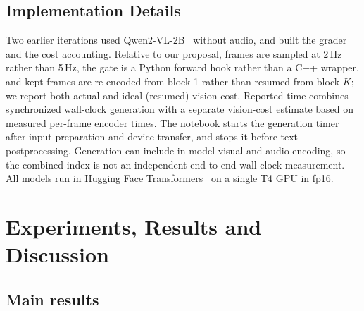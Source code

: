 \documentclass[conference]{IEEEtran}
\begin{document}
\subsection{Implementation Details}
Two earlier iterations used Qwen2-VL-2B~\cite{wang2024qwen2vl} without audio, and built the grader and the cost accounting. Relative to our proposal, frames are sampled at 2\,Hz rather than 5\,Hz, the gate is a Python forward hook rather than a C++ wrapper, and kept frames are re-encoded from block 1 rather than resumed from block $K$; we report both actual and ideal (resumed) vision cost. Reported time combines synchronized wall-clock generation with a separate vision-cost estimate based on measured per-frame encoder times. The notebook starts the generation timer after input preparation and device transfer, and stops it before text postprocessing. Generation can include in-model visual and audio encoding, so the combined index is not an independent end-to-end wall-clock measurement. All models run in Hugging Face Transformers~\cite{wolf2020transformers} on a single T4 GPU in fp16.

\section{Experiments, Results and Discussion}
\subsection{Main results}
\end{document}
